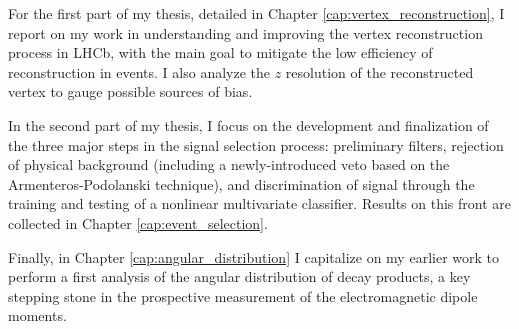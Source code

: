 For the first part of my thesis, detailed in Chapter \ref{cap:vertex_reconstruction}, I report on my work in understanding and improving the vertex reconstruction process in LHCb, with the main goal to mitigate the low efficiency of \lambdadecay reconstruction in \demonstratorshort events.
I also analyze the $z$ resolution of the reconstructed \lz vertex to gauge possible sources of bias.

In the second part of my thesis, I focus on the development and finalization of the three major steps in the signal selection process: preliminary filters, rejection of \physbkgshort physical background (including a newly-introduced \kshort veto based on the Armenteros-Podolanski technique), and discrimination of signal through the training and testing of a nonlinear multivariate classifier.
Results on this front are collected in Chapter \ref{cap:event_selection}.

Finally, in Chapter \ref{cap:angular_distribution} I capitalize on my earlier work to perform a first analysis of the angular distribution of \lambdadecay decay products, a key stepping stone in the prospective measurement of the \lz electromagnetic dipole moments.